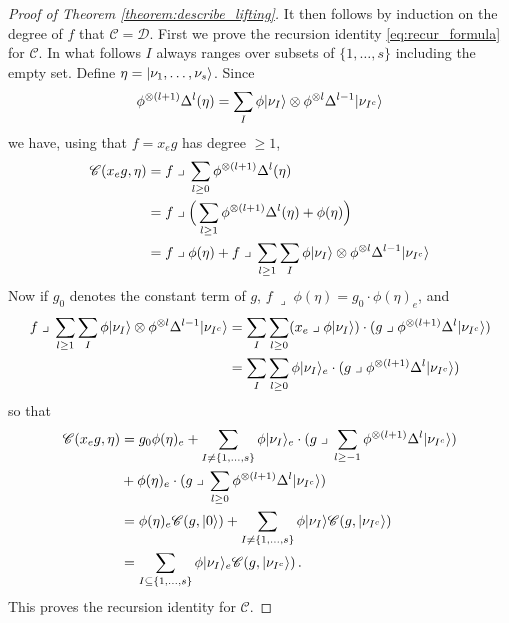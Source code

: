 \documentclass[english,letter paper,12pt,reqno]{article}
\DeclarePairedDelimiter\ket{\lvert}{\rangle}
\theoremstyle{example}
\numberwithin{equation}{section}
\def\contract{\;\lrcorner\;}
\begin{document}
\begin{proof}[Proof of Theorem \ref{theorem:describe_lifting}]
It then follows by induction on the degree of $f$ that $\mathscr{C} = \mathscr{D}$. First we prove the recursion identity \eqref{eq:recur_formula} for $\mathscr{C}$. In what follows $I$ always ranges over subsets of $\{ 1, \ldots, s \}$ including the empty set. Define $\eta = \ket{\nu_1,\ldots,\nu_s}$. Since
\[
\phi^{\otimes(l+1)} \Delta^l( \eta ) = \sum_I \phi \ket{\nu_I} \otimes \phi^{\otimes l} \Delta^{l-1} \ket{\nu_{I^c}}
\]
we have, using that $f = x_e g$ has degree $\ge 1$,
\begin{align*}
\mathscr{C}( x_e g, \eta ) &= f \contract \sum_{l \ge 0} \phi^{\otimes (l+1)} \Delta^l ( \eta )\\
&= f \contract \Big( \sum_{l \ge 1} \phi^{\otimes (l+1)} \Delta^l( \eta ) + \phi( \eta ) \Big)\\
&= f \contract \phi( \eta ) + f \contract \sum_{l \ge 1} \sum_I \phi \ket{\nu_I} \otimes \phi^{\otimes l} \Delta^{l-1} \ket{\nu_{I^c}}
\end{align*}
Now if $g_0$ denotes the constant term of $g$, $f \contract \phi( \eta ) = g_0 \cdot \phi( \eta )_e$, and
\begin{align*}
f \contract \sum_{l \ge 1} \sum_I \phi \ket{\nu_I} \otimes \phi^{\otimes l} \Delta^{l-1} \ket{\nu_{I^c}} &= \sum_I \sum_{l \ge 0} ( x_e \contract \phi\ket{\nu_I} ) \cdot ( g \contract \phi^{\otimes (l+1)} \Delta^l \ket{\nu_{I^c}})\\
&= \sum_I \sum_{l \ge 0} \phi\ket{\nu_I}_e \cdot ( g \contract \phi^{\otimes (l+1)} \Delta^l \ket{\nu_{I^c}})
\end{align*}
so that
\begin{align*}
\mathscr{C}( x_e g, \eta ) &= g_0 \phi( \eta )_e + \sum_{I \neq \{1,\ldots,s\}} \phi \ket{\nu_I}_e \cdot ( g \contract \sum_{l \ge -1} \phi^{\otimes (l+1)} \Delta^l \ket{\nu_{I^c}})\\
&+ \phi( \eta )_e \cdot ( g \contract \sum_{l \ge 0} \phi^{\otimes (l+1)} \Delta^l \ket{\nu_{I^c}})\\
&= \phi( \eta )_e \mathscr{C}(g, \ket{0}) + \sum_{I \neq \{1,\ldots,s\}} \phi \ket{\nu_I} \mathscr{C}(g, \ket{\nu_{I^c}})\\
&= \sum_{I \subseteq \{ 1,\ldots,s\}} \phi\ket{\nu_I}_e \mathscr{C}( g, \ket{\nu_{I^c}})\,.
\end{align*}
This proves the recursion identity for $\mathscr{C}$. 


\end{proof}
\end{document}
